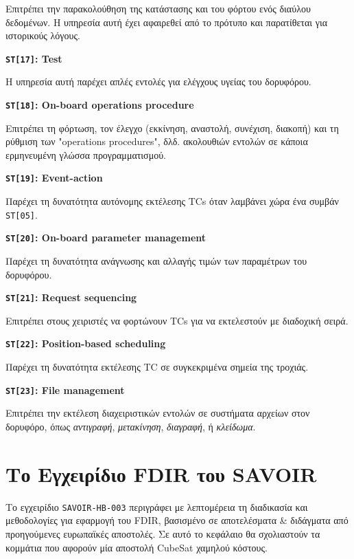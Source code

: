 \documentclass[a4paper,nobib]{tufte-book}
\begin{document}
\begin{compactitem}
		Επιτρέπει την παρακολούθηση της κατάστασης και του φόρτου ενός διαύλου δεδομένων. Η υπηρεσία αυτή έχει αφαιρεθεί από το πρότυπο και παρατίθεται για ιστορικούς λόγους.
		
		\item \textbf{\texttt{ST[17]}: Test}
		
		Η υπηρεσία αυτή παρέχει απλές εντολές για ελέγχους υγείας του δορυφόρου.
		
		\item \textbf{\texttt{ST[18]}: On-board operations procedure}
		
		Επιτρέπει τη φόρτωση, τον έλεγχο (εκκίνηση, αναστολή, συνέχιση, διακοπή) και τη ρύθμιση των "operations procedures", δλδ. ακολουθιών εντολών σε κάποια ερμηνευμένη γλώσσα προγραμματισμού.
		
		\item \textbf{\texttt{ST[19]}: Event-action}
		
		Παρέχει τη δυνατότητα αυτόνομης εκτέλεσης \acp{TC} όταν λαμβάνει χώρα ένα συμβάν \texttt{ST[05]}.
		
		\item \textbf{\texttt{ST[20]}: On-board parameter management}
		
		Παρέχει τη δυνατότητα ανάγνωσης και αλλαγής τιμών των παραμέτρων του δορυφόρου.
		
		\item \textbf{\texttt{ST[21]}: Request sequencing}
		
		Επιτρέπει στους χειριστές να φορτώνουν \acp{TC} για να εκτελεστούν με διαδοχική σειρά.
		
		\item \textbf{\texttt{ST[22]}: Position-based scheduling}
		
		Παρέχει τη δυνατότητα εκτέλεσης \ac{TC} σε συγκεκριμένα σημεία της τροχιάς.
		
		\item \textbf{\texttt{ST[23]}: File management}
		
		Επιτρέπει την εκτέλεση διαχειριστικών εντολών σε συστήματα αρχείων στον δορυφόρο, όπως \emph{αντιγραφή}, \emph{μετακίνηση}, \emph{διαγραφή}, ή \emph{κλείδωμα}.
\end{compactitem}

\section{Το Εγχειρίδιο \acs{FDIR} του \acs{SAVOIR}}

Το εγχειρίδιο \texttt{SAVOIR-HB-003} περιγράφει με λεπτομέρεια τη διαδικασία και μεθοδολογίες για εφαρμογή του \acs{FDIR}, βασισμένο σε αποτελέσματα \& διδάγματα από προηγούμενες ευρωπαϊκές αποστολές. Σε αυτό το κεφάλαιο θα σχολιαστούν τα κομμάτια που αφορούν μία αποστολή CubeSat χαμηλού κόστους.
\end{document}
